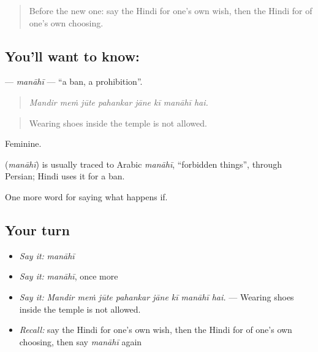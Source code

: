 \label{lesson:HI-C550-manahi}



\begin{quote}
Before the new one: say the Hindi for one's own wish, then the Hindi for of one's own choosing.
\end{quote}

\subsection*{You'll want to know: }
\textbf{} — \emph{manāhī} — \textquotedblleft{}a ban, a prohibition\textquotedblright{}.

\begin{quote}
       
\end{quote}

\begin{quote}
\emph{Mandir meṁ jūte pahankar jāne kī manāhī hai.}
\end{quote}

\begin{quote}
Wearing shoes inside the temple is not allowed.
\end{quote}

Feminine.

\begin{cousinweb}
\textbf{} (\emph{manāhī}) is usually traced to Arabic \emph{manāhī}, \textquotedblleft{}forbidden things\textquotedblright{}, through Persian; Hindi uses it for a ban.
\end{cousinweb}

\begin{grammarlens}[title={What you've built}]
One more word for saying what happens if.
\end{grammarlens}

\subsection*{Your turn}
\begin{itemize}
\raggedright
  \item \emph{Say it:} \emph{manāhī}
  \item \emph{Say it:} \emph{manāhī}, once more
  \item \emph{Say it:} \emph{Mandir meṁ jūte pahankar jāne kī manāhī hai.} — Wearing shoes inside the temple is not allowed.
  \item \emph{Recall:} say the Hindi for one's own wish, then the Hindi for of one's own choosing, then say \emph{manāhī} again
\end{itemize}

